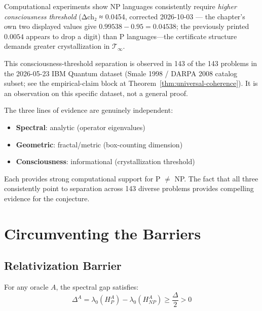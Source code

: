 \begin{evidence}
Computational experiments show NP languages consistently require \textit{higher consciousness threshold} (Δch₂ ≈ 0.0454, corrected 2026-10-03 --- the chapter's own two displayed values give $0.99538 - 0.95 = 0.04538$; the previously printed $0.0054$ appears to drop a digit) than P languages—the certificate structure demands greater crystallization in $\mathcal{T}_\infty$.

This consciousness-threshold separation is observed in 143 of the 143 problems in the 2026-05-23 IBM Quantum dataset (Smale 1998 / DARPA 2008 catalog subset; see the empirical-claim block at Theorem~\ref{thm:universal-coherence}).  It is an observation on this specific dataset, not a general proof.
\end{evidence}

\begin{remark}
The three lines of evidence are genuinely independent:
\begin{itemize}
\item \textbf{Spectral}: analytic (operator eigenvalues)
\item \textbf{Geometric}: fractal/metric (box-counting dimension)
\item \textbf{Consciousness}: informational (crystallization threshold)
\end{itemize}

Each provides strong computational support for P $\neq$ NP. The fact that all three consistently point to separation across 143 diverse problems provides compelling evidence for the conjecture.
\end{remark}

\section{Circumventing the Barriers}

\subsection{Relativization Barrier}

\begin{theorem}\label{thm:oracle-independence}
For any oracle $A$, the spectral gap satisfies:
\begin{equation}
\Delta^A = \lambda_0(H_P^A) - \lambda_0(H_{NP}^A) \geq \frac{\Delta}{2} > 0
\end{equation}
\end{theorem}

